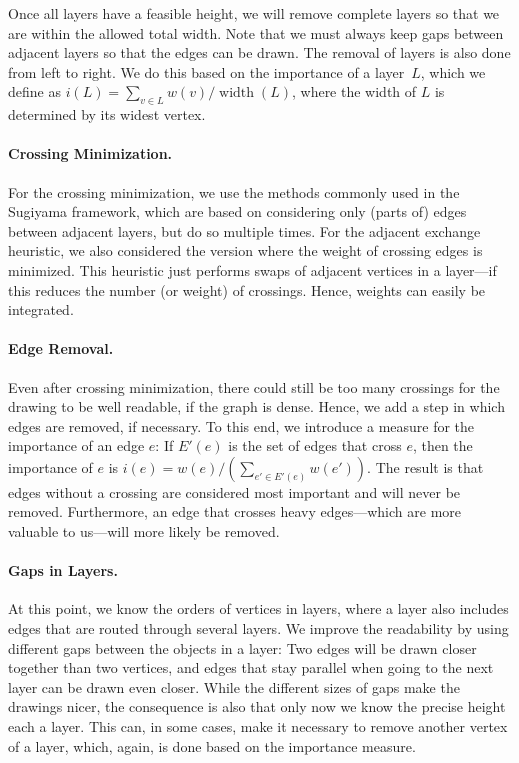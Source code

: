 \documentclass[]{llncs}
\begin{document}
Once all layers have a feasible height, we will remove complete
layers so that we are within the allowed total width. Note that we
must always keep gaps between adjacent layers so that the edges can be
drawn. The removal of layers is also done from left to right.
We do this based on the importance of a layer~$L$, which we define as
$i(L) = \sum_{v \in L} w(v) / \operatorname{width}(L)$, where the
width of $L$ is determined by its widest vertex.

\paragraph{Crossing Minimization.}
For the crossing minimization, we use the methods commonly used in
the Sugiyama framework, which are based on considering only (parts of)
edges between adjacent layers, but do so multiple times.
For the adjacent exchange heuristic, we also
considered the version where the weight of crossing edges is
minimized. This heuristic just performs swaps of adjacent vertices
in a layer---if this reduces the number (or weight) of
crossings. Hence, weights can easily be integrated.

\paragraph{Edge Removal.}
Even after crossing minimization, there could still be too many
crossings for the drawing to be well readable, if the graph is dense.
Hence, we add a step in
which edges are removed, if necessary. To this end, we introduce a
measure for the importance of an edge $e$: If $E'(e)$ is the set of
edges that cross $e$, then the importance of $e$ is $i(e) =
w(e)/(\sum_{e' \in E'(e)} w(e'))$. The result is that edges without a
crossing are considered most important and will never be removed.
Furthermore, an edge that crosses heavy edges---which are more
valuable to us---will more likely be removed.

\paragraph{Gaps in Layers.}
At this point, we know the orders of vertices in layers,
where a layer also includes edges that are routed through several
layers. We improve the readability by using different
gaps between the objects in a layer: Two edges will be drawn closer
together than two vertices, and edges that stay parallel when going to
the next layer can be drawn even closer. While the different sizes of
gaps make the drawings nicer, the consequence is also that only now we
know the precise height each a layer. This can, in some cases, make it
necessary to remove another vertex of a layer, which, again, is done
based on the importance measure.
\end{document}
